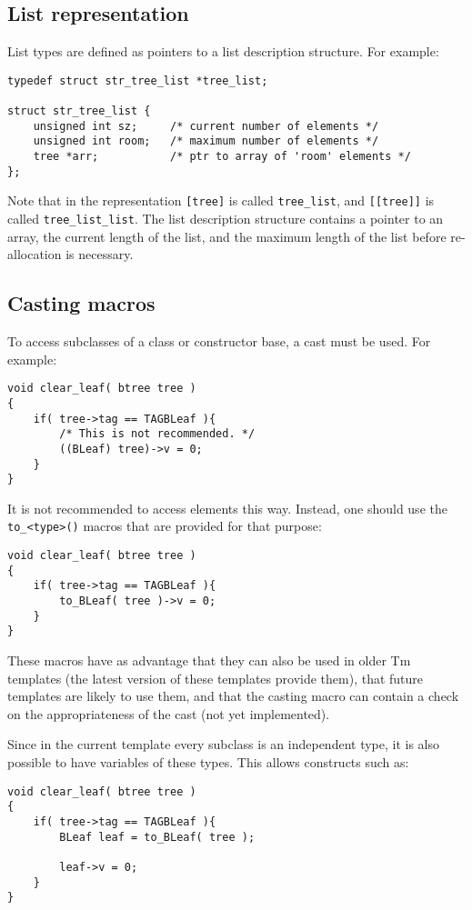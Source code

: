 \subsection{List representation}
List types are defined as pointers to a list description structure.
For example:
\begin{showfile}
\begin{verbatim}
typedef struct str_tree_list *tree_list;

struct str_tree_list {
    unsigned int sz;     /* current number of elements */
    unsigned int room;   /* maximum number of elements */
    tree *arr;           /* ptr to array of 'room' elements */
};
\end{verbatim}
\end{showfile}
\begin{sloppypar}
Note that in the {\C} representation \verb+[tree]+ is called
\verb+tree_list+, and \verb+[[tree]]+ is called \verb+tree_list_list+.
The list description structure contains a pointer to an array, the
current length of the list, and the maximum length of the list before
re-allocation is necessary.
\end{sloppypar}
\subsection{Casting macros}
To access subclasses of a class or constructor base, a cast must be used.
For example:
\begin{showfile}
\begin{verbatim}
void clear_leaf( btree tree )
{
    if( tree->tag == TAGBLeaf ){
        /* This is not recommended. */
        ((BLeaf) tree)->v = 0;
    }
}
\end{verbatim}
\end{showfile}
It is not recommended to access elements this way. Instead, one should
use the \verb'to_<type>()' macros that are provided for that purpose:
\begin{showfile}
\begin{verbatim}
void clear_leaf( btree tree )
{
    if( tree->tag == TAGBLeaf ){
        to_BLeaf( tree )->v = 0;
    }
}
\end{verbatim}
\end{showfile}
These macros have as advantage that they can also be used in older
Tm templates (the latest version of these templates provide them),
that future templates are likely to use them, and that the casting
macro can contain a check on the appropriateness of the cast
(not yet implemented).
\par
Since in the current template every subclass is an independent type,
it is also possible to have variables of these types. This allows
constructs such as:
\begin{showfile}
\begin{verbatim}
void clear_leaf( btree tree )
{
    if( tree->tag == TAGBLeaf ){
        BLeaf leaf = to_BLeaf( tree );

        leaf->v = 0;
    }
}
\end{verbatim}
\end{showfile}

